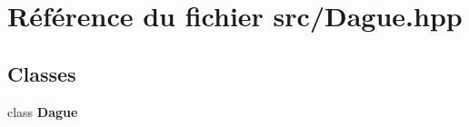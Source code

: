 \section{Référence du fichier src/\-Dague.hpp}
\label{_dague_8hpp}
\subsection*{Classes}
\begin{DoxyCompactItemize}
\item 
class {\bf Dague}
\end{DoxyCompactItemize}
